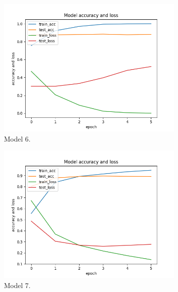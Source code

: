 \documentclass[11pt]{article}
\begin{document}
\begin{figure}[h!]
\begin{subfigure}{0.32\textwidth}
         \includegraphics[width=\textwidth]{model6.png}
         \caption{Model 6.}
         \label{fig:model6}
\end{subfigure}
\hfill
\begin{subfigure}{0.32\textwidth}
         \centering
         \includegraphics[width=\textwidth]{model7.png}
         \caption{Model 7.}
         \label{fig:model7}
\end{subfigure}
\hfill
\begin{subfigure}{0.32\textwidth}
         \centering

\end{subfigure}
\end{figure}
\end{document}
